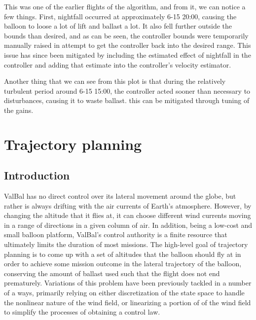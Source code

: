 \documentclass[11pt]{scrartcl} %
\begin{document}
This was one of the earlier flights of the algorithm, and from it, we can notice a few things. First, nightfall occurred at approximately 6-15 20:00, causing the balloon to loose a lot of lift and ballast a lot. It also fell further outside the bounds than desired, and as can be seen, the controller bounds were temporarily manually raised in attempt to get the controller back into the desired range. This issue has since been mitigated by including the estimated effect of nightfall in the controller  and adding that estimate into the controller's velocity estimator.

Another thing that we can see from this plot is that during the relatively turbulent period around 6-15 15:00, the controller acted sooner than necessary to disturbances, causing it to waste ballast. this can be mitigated through tuning of the gains.

\newpage
\section{Trajectory planning}
\label{TP}

\subsection{Introduction}


ValBal has no direct control over its lateral movement around the globe, but rather is always drifting with the air currents of Earth's atmosphere. However, by changing the altitude that it flies at, it can choose different wind currents moving in a range of directions in a given column of air. In addition, being a low-cost and small balloon platform, ValBal's control authority is a finite resource that ultimately limits the duration of most missions. The high-level goal of trajectory planning is to come up with a set of altitudes that the balloon should fly at in order to achieve some mission outcome in the lateral trajectory of the balloon, conserving the amount of ballast used such that the flight does not end prematurely. Variations of this problem have been previously tackled in a number of a ways, primarily relying on either discretization of the state space to handle the nonlinear nature of the wind field, or linearizing a portion of of the wind field to simplify the processes of obtaining a control law. 
\end{document}
